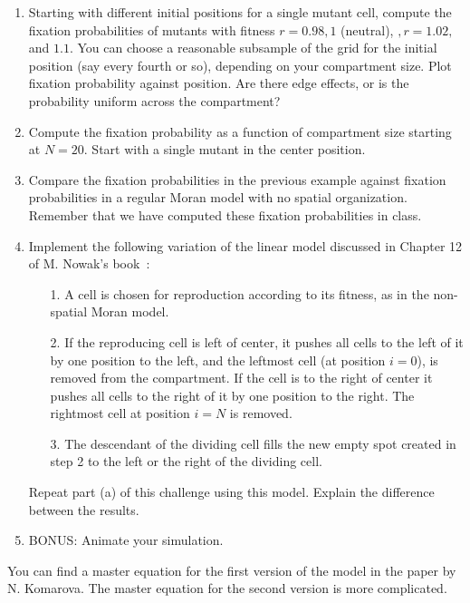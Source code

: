 \documentclass[12pt]{article}
\begin{document}
\begin{enumerate}
 \begin{enumerate}
 \item Starting with different initial positions for a single mutant cell, compute the fixation probabilities 
 of mutants with fitness $r = 0.98, 1$ (neutral), $,r = 1.02,$ and $1.1$.  You can choose a reasonable
 subsample of the grid for the initial position (say every fourth or so), depending on your compartment size.  Plot 
 fixation probability against position.  Are there edge effects, or is the probability uniform across the compartment? 
 \item Compute the fixation probability as a function of compartment size starting at $N = 20$.
 Start with a single mutant in the center position.    
 \item Compare the fixation probabilities in the previous example against fixation probabilities in 
 a regular Moran model with no spatial organization.  Remember that we have computed these 
 fixation probabilities in class. 
\item  Implement the following variation of the linear model discussed in Chapter 12 of M. Nowak's book~\cite{nowak06}:
\begin{enumerate} 
\item[1.] A cell is chosen for reproduction according to its fitness, as in the non-spatial Moran model.
\item[2.] If the reproducing cell is left of center, it pushes all cells to the left of it by one position to the left, and the leftmost cell (at position $i =0$), 
is removed from the compartment.  If the cell is to the right of center it pushes all cells to the right of it by one position to the right.
The rightmost cell at position $i = N$ is removed. 
\item[3.] The descendant of the dividing cell fills the new empty spot created in step 2 to the left or the right of the dividing cell. 
\end{enumerate} 
Repeat part (a) of this challenge using this model.  Explain the difference between the results.
\item BONUS: Animate your simulation.
\end{enumerate}
You can find a master equation for the first version of the model in the paper by N. Komarova.
The master equation for the second version is more complicated.


\end{enumerate}
\end{document}
